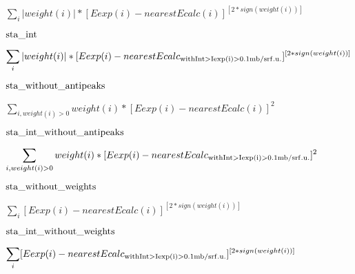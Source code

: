 \documentclass[twoside]{article}
\def\lthtmlcheckvsize{\ifdim\ht\sizebox<\vsize 
  \ifdim\wd\sizebox<\hsize\expandafter\hfill\fi \expandafter\vfill
  \else\expandafter\vss\fi}%
\begin{document}
{\newpage\clearpage
{}%
$\displaystyle \sum_i |weight(i)|*[Eexp(i) - nearestEcalc(i)]^{[2*sign(weight(i))]}$%
\lthtmlindisplaymathZ
\lthtmlcheckvsize\clearpage}

{\newpage\clearpage
{}%
$\displaystyle {\rm sta\_int   }$%
\lthtmlindisplaymathZ
\lthtmlcheckvsize\clearpage}

{\newpage\clearpage
{}%
$\displaystyle \sum_i |weight(i)|*[Eexp(i) - nearestEcalc_{\rm with %
Int>Iexp(i)>0.1mb/srf.u.}]^{[2*sign(weight(i))]}$%
\lthtmlindisplaymathZ
\lthtmlcheckvsize\clearpage}

{\newpage\clearpage
{}%
$\displaystyle {\rm sta\_without\_antipeaks }$%
\lthtmlindisplaymathZ
\lthtmlcheckvsize\clearpage}

{\newpage\clearpage
{}%
$\displaystyle \sum_{i, weight(i)>0}  weight(i)*[Eexp(i) - nearestEcalc(i)]^2$%
\lthtmlindisplaymathZ
\lthtmlcheckvsize\clearpage}

{\newpage\clearpage
{}%
$\displaystyle {\rm sta\_int\_without\_antipeaks }$%
\lthtmlindisplaymathZ
\lthtmlcheckvsize\clearpage}

{\newpage\clearpage
{}%
$\displaystyle \sum_{i,weight(i)>0}  weight(i)*[Eexp(i) - nearestEcalc_{\rm with %
Int>Iexp(i)>0.1mb/srf.u.}]^2$%
\lthtmlindisplaymathZ
\lthtmlcheckvsize\clearpage}

{\newpage\clearpage
{}%
$\displaystyle {\rm sta\_without\_weights }$%
\lthtmlindisplaymathZ
\lthtmlcheckvsize\clearpage}

{\newpage\clearpage
{}%
$\displaystyle \sum_i [Eexp(i) - nearestEcalc(i)]^{[2*sign(weight(i))]}$%
\lthtmlindisplaymathZ
\lthtmlcheckvsize\clearpage}

{\newpage\clearpage
{}%
$\displaystyle {\rm sta\_int\_without\_weights}$%
\lthtmlindisplaymathZ
\lthtmlcheckvsize\clearpage}

{\newpage\clearpage
{}%
$\displaystyle \sum_i [Eexp(i) - nearestEcalc_{\rm with %
Int>Iexp(i)>0.1mb/srf.u.}]^{[2*sign(weight(i))]}$%
\lthtmlindisplaymathZ
\lthtmlcheckvsize\clearpage}
\end{document}
